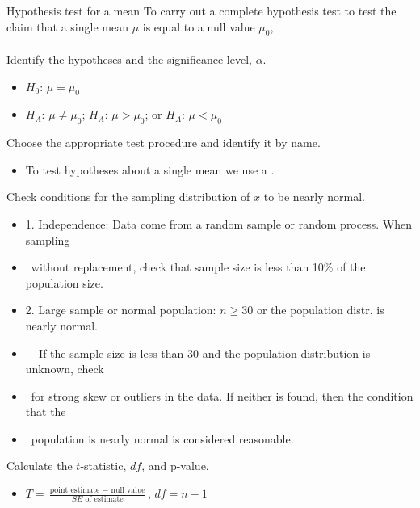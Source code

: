 \begin{onebox}{Hypothesis test for a mean}
To carry out a complete hypothesis test to test the claim that a single mean $\mu$ is equal to a null value $\mu_0$,
\\
\\
 Identify the hypotheses and the significance level, $\alpha$.\vspace{-1mm}
\begin{itemize}
\setlength{\itemsep}{0mm}
\item[] $H_0$: $\mu = \mu_0$  
\item[]  $H_A$: $\mu \ne \mu_0$;  \quad $H_A$: $\mu > \mu_0$; \quad or \quad $H_A$: $\mu < \mu_0$ 
\end{itemize} 
 Choose the appropriate test procedure and identify it by name. \vspace{-1mm}
\begin{itemize}
\item[] To test hypotheses about a single mean we use a .
\end{itemize}
  Check conditions for the sampling distribution of $\bar{x}$ to be nearly normal.\vspace{-1mm}
\begin{itemize}
\setlength{\itemsep}{0mm}
\item[] 1.  Independence:  Data come from a random sample or random process.  When sampling 
\item[] \quad \ without replacement, check that sample size is less than 10\% of the population size.
\item[] 2. Large sample or normal population:  $n\ge 30$ or the population distr. is nearly normal.
\item[] \quad \ - If the sample size is less than 30 and the population distribution is unknown, check 
\item[] \quad \ for strong skew or outliers in the data.  If neither is found, then the condition that the 
\item[] \quad \ population is nearly normal is considered reasonable.  
\end{itemize}
  Calculate the $t$-statistic, $df$, and p-value.
\begin{itemize}
\item[] $T = \frac{\text{point estimate } - \text{ null value}}{SE \text{ of estimate}}$,  \quad $df=n-1$
\begin{itemize}

\end{itemize}
\end{itemize}
\end{onebox}
